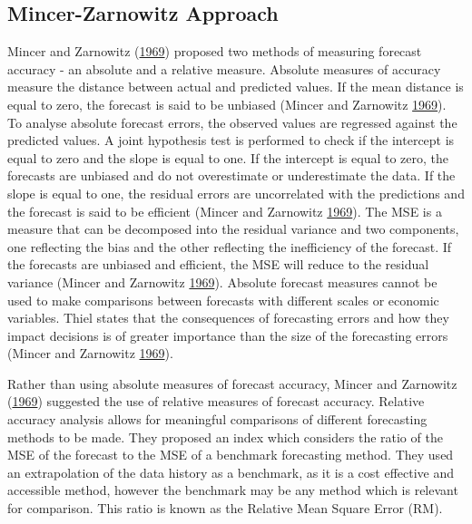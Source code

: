 \documentclass[12pt,preprint, authoryear]{elsarticle}
\numberwithin{equation}{section}
\numberwithin{figure}{section}
\numberwithin{table}{section}
\begin{document}
\subsection{Mincer-Zarnowitz Approach}\label{mincer-zarnowitz-approach}

Mincer and Zarnowitz
(\protect\hyperlink{ref-mincer1969evaluation}{1969}) proposed two
methods of measuring forecast accuracy - an absolute and a relative
measure. Absolute measures of accuracy measure the distance between
actual and predicted values. If the mean distance is equal to zero, the
forecast is said to be unbiased (Mincer and Zarnowitz
\protect\hyperlink{ref-mincer1969evaluation}{1969}). To analyse absolute
forecast errors, the observed values are regressed against the predicted
values. A joint hypothesis test is performed to check if the intercept
is equal to zero and the slope is equal to one. If the intercept is
equal to zero, the forecasts are unbiased and do not overestimate or
underestimate the data. If the slope is equal to one, the residual
errors are uncorrelated with the predictions and the forecast is said to
be efficient (Mincer and Zarnowitz
\protect\hyperlink{ref-mincer1969evaluation}{1969}). The MSE is a
measure that can be decomposed into the residual variance and two
components, one reflecting the bias and the other reflecting the
inefficiency of the forecast. If the forecasts are unbiased and
efficient, the MSE will reduce to the residual variance (Mincer and
Zarnowitz \protect\hyperlink{ref-mincer1969evaluation}{1969}). Absolute
forecast measures cannot be used to make comparisons between forecasts
with different scales or economic variables. Thiel states that the
consequences of forecasting errors and how they impact decisions is of
greater importance than the size of the forecasting errors (Mincer and
Zarnowitz \protect\hyperlink{ref-mincer1969evaluation}{1969}).

Rather than using absolute measures of forecast accuracy, Mincer and
Zarnowitz (\protect\hyperlink{ref-mincer1969evaluation}{1969}) suggested
the use of relative measures of forecast accuracy. Relative accuracy
analysis allows for meaningful comparisons of different forecasting
methods to be made. They proposed an index which considers the ratio of
the MSE of the forecast to the MSE of a benchmark forecasting method.
They used an extrapolation of the data history as a benchmark, as it is
a cost effective and accessible method, however the benchmark may be any
method which is relevant for comparison. This ratio is known as the
Relative Mean Square Error (RM).
\end{document}
